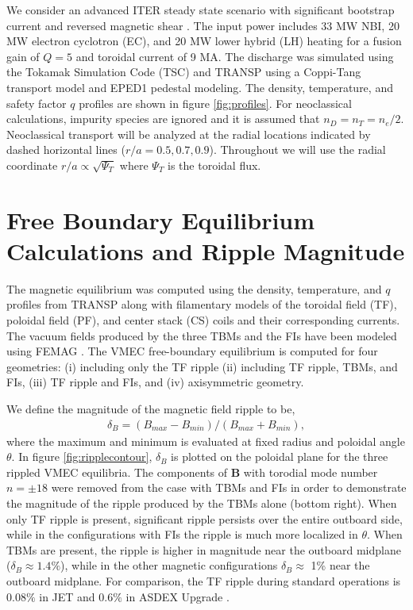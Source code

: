 \documentclass{article}
\numberwithin{figure}{section}
\numberwithin{equation}{section}
\begin{document}
We consider an advanced ITER steady state scenario with significant bootstrap current and reversed magnetic shear \cite{Poli2014}. The input power includes 33 MW NBI, 20 MW electron cyclotron (EC), and 20 MW lower hybrid (LH) heating for a fusion gain of $Q = 5$ and toroidal current of 9 MA. The discharge was simulated using the Tokamak Simulation Code (TSC) \cite{Jardin1986} and TRANSP \cite{Hawryluk1980} using a Coppi-Tang \cite{Jardin1993} transport model and EPED1 \cite{Snyder2011} pedestal modeling. The density, temperature, and safety factor $q$ profiles are shown in figure \ref{fig:profiles}. For neoclassical calculations, impurity species are ignored and it is assumed that $n_D = n_T = n_e/2$. Neoclassical transport will be analyzed at the radial locations indicated by dashed horizontal lines ($r/a = 0.5, 0.7, 0.9$). Throughout we will use the radial coordinate $r/a \propto \sqrt{\Psi_T}$ where $\Psi_T$ is the toroidal flux.

\FloatBarrier

\section{Free Boundary Equilibrium Calculations and Ripple Magnitude} \label{vmec}

The magnetic equilibrium was computed using the density, temperature, and $q$ profiles from TRANSP along with filamentary models of the toroidal field (TF), poloidal field (PF), and center stack (CS) coils and their corresponding currents. The vacuum fields produced by the three TBMs and the FIs have been modeled using FEMAG \cite{Shinohara2009}. The VMEC free-boundary equilibrium \cite{Hirshman1986} is computed for four geometries: (i) including only the TF ripple (ii) including TF ripple, TBMs, and FIs, (iii) TF ripple and FIs, and (iv) axisymmetric geometry.  

We define the magnitude of the magnetic field ripple to be,
\begin{gather}
\delta_B = (B_{max}-B_{min})/(B_{max} + B_{min}), 
\end{gather}
where the maximum and minimum is evaluated at fixed radius and poloidal angle $\theta$. In figure \ref{fig:ripplecontour}, $\delta_B$ is plotted on the poloidal plane for the three rippled VMEC equilibria. The components of $\bm{B}$ with torodial mode number $n = \pm 18$ were removed from the case with TBMs and FIs in order to demonstrate the magnitude of the ripple produced by the TBMs alone (bottom right). When only TF ripple is present, significant ripple persists over the entire outboard side, while in the configurations with FIs the ripple is much more localized in $\theta$. When TBMs are present, the ripple is higher in magnitude near the outboard midplane ($\delta_B \approx 1.4\%$), while in the other magnetic configurations $\delta_B \approx$ 1\% near the outboard midplane. For comparison, the TF ripple during standard operations is $0.08\%$ in JET \cite{DeVries2008} and $0.6\%$ in ASDEX Upgrade \cite{Martitsch2016}. 
\end{document}

